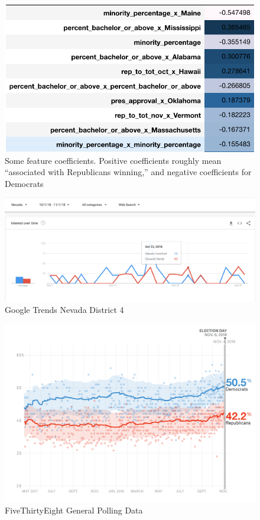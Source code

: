 \documentclass[12pt, letterpaper]{article}
\begin{document}
\begin{figure}[tbh]
  \centering
  \includegraphics[scale=0.8]{feature_coeff}
  \caption{Some feature coefficients. Positive coefficients roughly mean ``associated with Republicans winning,'' and negative coefficients for Democrats}
  \label{fig:feature}
\end{figure}

 \begin{figure}[tbh]
  \centering
  \includegraphics[scale=0.4]{google_trends_ex}
  \caption{Google Trends Nevada District 4}
  \label{fig:trends}
\end{figure}

 \begin{figure}[tbh]
  \centering
  \includegraphics[scale=0.45]{general_polling}
  \caption{FiveThirtyEight General Polling Data}
  \label{fig:genpolls}
\end{figure}
\end{document}
